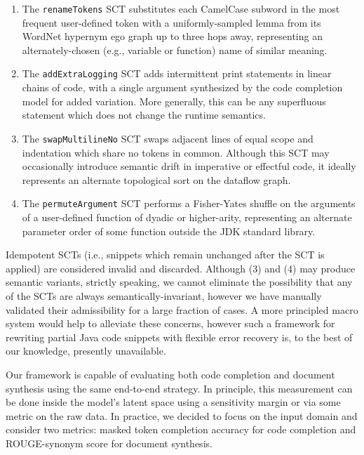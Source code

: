 \documentclass[usenames,dvipsnames]{article} %
\begin{document}
\begin{enumerate}[itemsep=1ex]
  \item The \lstinline|renameTokens| SCT substitutes each CamelCase subword in the most frequent user-defined token with a uniformly-sampled lemma from its WordNet hypernym ego graph up to three hops away, representing an alternately-chosen (e.g., variable or function) name of similar meaning.
  \item The \lstinline|addExtraLogging| SCT adds intermittent print statements in linear chains of code, with a single argument synthesized by the code completion model for added variation. More generally, this can be any superfluous statement which does not change the runtime semantics.
  \item The \lstinline|swapMultilineNo| SCT swaps adjacent lines of equal scope and indentation which share no tokens in common. Although this SCT may occasionally introduce semantic drift in imperative or effectful code, it ideally represents an alternate topological sort on the dataflow graph.
  \item The \lstinline|permuteArgument| SCT performs a Fisher-Yates shuffle on the arguments of a user-defined function of dyadic or higher-arity, representing an alternate parameter order of some function outside the JDK standard library.
\end{enumerate}

Idempotent SCTs (i.e., snippets which remain unchanged after the SCT is applied) are considered invalid and discarded. Although (3) and (4) may produce semantic variants, strictly speaking, we cannot eliminate the possibility that any of the SCTs are always semantically-invariant, however we have manually validated their admissibility for a large fraction of cases. A more principled macro system would help to alleviate these concerns, however such a framework for rewriting partial Java code snippets with flexible error recovery is, to the best of our knowledge, presently unavailable.

Our framework is capable of evaluating both code completion and document synthesis using the same end-to-end strategy. In principle, this measurement can be done inside the model's latent space using a sensitivity margin or via some metric on the raw data. In practice, we decided to focus on the input domain and consider two metrics: masked token completion accuracy for code completion and ROUGE-synonym score for document synthesis.

\pagebreak
\end{document}
